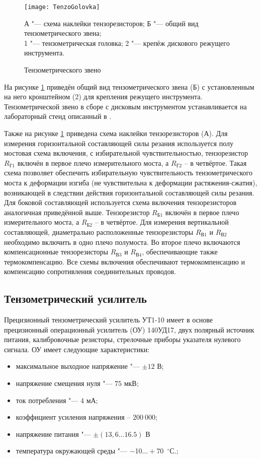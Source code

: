 \begin{figure} [htbp]
	\center
	\texttt{[image: TenzoGolovka]}
	
	А "--- схема наклейки тензорезисторов; Б "--- общий вид тензометрического звена;\\
	1 "--- тензометрическая головка; 2 "--- крепёж дискового режущего инструмента.
	\caption{Тензометрического звено} 
	\label{img:TenzoGolovka}  
\end{figure}

На рисунке \ref{img:TenzoGolovka} приведён общий вид тензометрического звена (Б) с установленным на него кронштейном (2) для крепления режущего инструмента. Тензометрической звено в сборе с дисковым инструментом устанавливается на лабораторный стенд описанный в \todo{[ссылки]}.

Также на рисунке \ref{img:TenzoGolovka} приведена схема наклейки тензорезисторов (А). Для измерения горизонтальной составляющей силы резания используется полу мостовая схема включения, с избирательной чувствительностью, тензорезистор $R_{\text{Г}1}$ включён в первое плечо измерительного моста, а $R_{\text{Г}2}$ – в четвёртое. Такая схема позволяет обеспечить избирательную чувствительность тензометрического моста к деформации изгиба (не чувствительна к деформации растяжения-сжатия), возникающей в следствии действия горизонтальной составляющей силы резания. Для боковой составляющей используется схема включения тензорезисторов аналогичная приведённой выше. Тензорезистор $R_{\text{Б}1}$ включён в первое плечо измерительного моста, а $R_{\text{Б}2}$ – в четвёртое. Для измерения вертикальной составляющей, диаметрально расположенные тензорезисторы $R_{\text{В}1}$ и $R_{\text{В}2}$ необходимо включить в одно плечо полумоста. Во второе плечо включаются компенсационные тензорезисторы $R_{\text{В}3}$ и $R_{\text{В}4}$, обеспечивающие также термокомпенсацию. Все схемы включения обеспечивают термокомпенсацию и компенсацию сопротивления соединительных проводов.


\subsection{Тензометрический усилитель}\label{subsect2_3_2}

Прецизионный тензометрический усилитель УТ1-10 имеет в основе прецизионный операционный усилитель (ОУ) 140УД17, двух полярный источник питания, калибровочные резисторы, стрелочные приборы указателя нулевого сигнала. ОУ имеет следующие характеристики:
\begin{itemize}
	\item максимальное выходное напряжение "--- $\pm12$ В;
	\item напряжение смещения нуля "--- $75$ мкВ;
	\item ток потребления "--- $4$ мА;
	\item коэффициент усиления напряжения – $200~000$;
	\item напряжение питания "--- $\pm(13,6\ldots16.5)$ В
	\item температура окружающей среды "--- $-$10$\ldots+$70~${}^\circ$С.;
\end{itemize}

